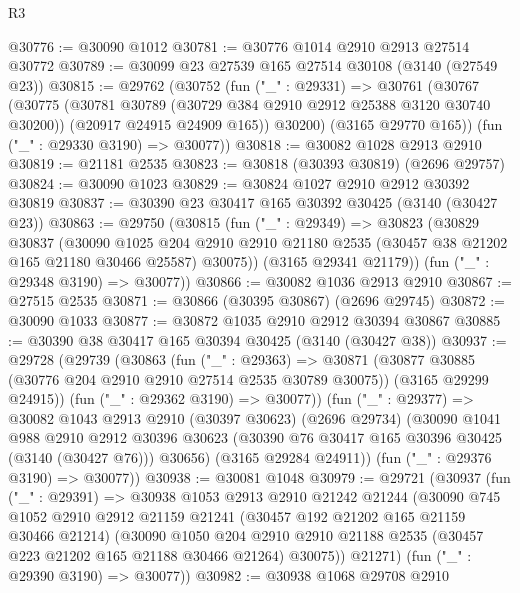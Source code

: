 \begin{lexlean}{R3}
\begin{coremodule}
@30776 := @30090 @1012
@30781 := @30776 @1014 @2910 @2913 @27514 @30772
@30789 := @30099 @23 @27539 @165 @27514 @30108 (@3140 (@27549 @23))
@30815 := @29762
    (@30752
      (fun ("_" : @29331) =>
      @30761
        (@30767
          (@30775
            (@30781 @30789 (@30729 @384 @2910 @2912 @25388 @3120 @30740 @30200))
            (@20917 @24915 @24909 @165))
          @30200)
        (@3165 @29770 @165))
      (fun ("_" : @29330 @3190) => @30077))
@30818 := @30082 @1028 @2913 @2910
@30819 := @21181 @2535
@30823 := @30818 (@30393 @30819) (@2696 @29757)
@30824 := @30090 @1023
@30829 := @30824 @1027 @2910 @2912 @30392 @30819
@30837 := @30390 @23 @30417 @165 @30392 @30425 (@3140 (@30427 @23))
@30863 := @29750
    (@30815
      (fun ("_" : @29349) =>
      @30823
        (@30829
          @30837
          (@30090
            @1025
            @204
            @2910
            @2910
            @21180
            @2535
            (@30457 @38 @21202 @165 @21180 @30466 @25587)
            @30075))
        (@3165 @29341 @21179))
      (fun ("_" : @29348 @3190) => @30077))
@30866 := @30082 @1036 @2913 @2910
@30867 := @27515 @2535
@30871 := @30866 (@30395 @30867) (@2696 @29745)
@30872 := @30090 @1033
@30877 := @30872 @1035 @2910 @2912 @30394 @30867
@30885 := @30390 @38 @30417 @165 @30394 @30425 (@3140 (@30427 @38))
@30937 := @29728
    (@29739
      (@30863
        (fun ("_" : @29363) =>
        @30871
          (@30877 @30885 (@30776 @204 @2910 @2910 @27514 @2535 @30789 @30075))
          (@3165 @29299 @24915))
        (fun ("_" : @29362 @3190) => @30077))
      (fun ("_" : @29377) =>
      @30082
        @1043
        @2913
        @2910
        (@30397 @30623)
        (@2696 @29734)
        (@30090
          @1041
          @988
          @2910
          @2912
          @30396
          @30623
          (@30390 @76 @30417 @165 @30396 @30425 (@3140 (@30427 @76)))
          @30656)
        (@3165 @29284 @24911))
      (fun ("_" : @29376 @3190) => @30077))
@30938 := @30081 @1048
@30979 := @29721
    (@30937
      (fun ("_" : @29391) =>
      @30938
        @1053
        @2913
        @2910
        @21242
        @21244
        (@30090
          @745
          @1052
          @2910
          @2912
          @21159
          @21241
          (@30457 @192 @21202 @165 @21159 @30466 @21214)
          (@30090
            @1050
            @204
            @2910
            @2910
            @21188
            @2535
            (@30457 @223 @21202 @165 @21188 @30466 @21264)
            @30075))
        @21271)
      (fun ("_" : @29390 @3190) => @30077))
@30982 := @30938 @1068 @29708 @2910

\end{coremodule}
\end{lexlean}
